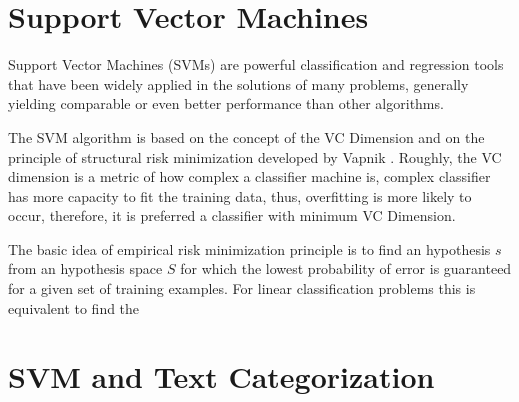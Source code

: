 
%




\section{Support Vector Machines}

Support Vector Machines (SVMs) \cite{Vapnik98} are powerful classification
and regression tools that have been widely applied in the solutions
of many problems, generally yielding comparable or even better performance
than other algorithms. 

The SVM algorithm is based on the concept of the VC Dimension\cite{vapnik71uniform}
and on the principle of structural risk minimization developed by
Vapnik \cite{Vapnik99,vapnik71uniform}. Roughly, the VC dimension
is a metric of how complex a classifier machine is, complex classifier
has more capacity to fit the training data, thus, overfitting is more
likely to occur, therefore, it is preferred a classifier with minimum
VC Dimension. 

The basic idea of empirical risk minimization principle is to find
an hypothesis $s$ from an hypothesis space $S$ for which the lowest
probability of error is guaranteed for a given set of training examples. 
For linear classification problems this is equivalent to find the

\section{SVM and Text Categorization}

